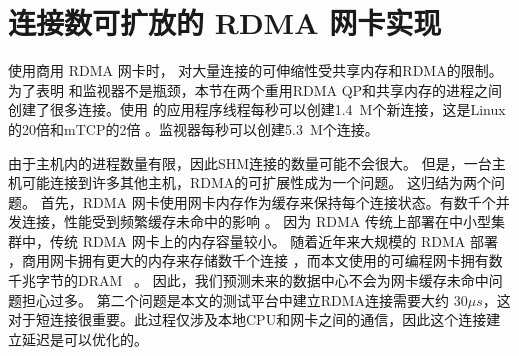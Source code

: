 \section{连接数可扩放的 RDMA 网卡实现}
\label{socksdirect:sec:discussion}




使用商用 RDMA 网卡时，\sys {} 对大量连接的可伸缩性受共享内存和RDMA的限制。
为了表明 \libipc {} 和监视器不是瓶颈，本节在两个重用RDMA QP和共享内存的进程之间创建了很多连接。使用 \libipc {} 的应用程序线程每秒可以创建1.4~M个新连接，这是Linux的20倍和mTCP的2倍 \cite {jeong2014mtcp}。监视器每秒可以创建5.3~M个连接。

由于主机内的进程数量有限，因此SHM连接的数量可能不会很大。
但是，一台主机可能连接到许多其他主机，RDMA的可扩展性成为一个问题。
这归结为两个问题。
首先，RDMA 网卡使用网卡内存作为缓存来保持每个连接状态。有数千个并发连接，性能受到频繁缓存未命中的影响 \cite {mprdma,kaminsky2016design,kalia2018datacenter}。
因为 RDMA 传统上部署在中小型集群中，传统 RDMA 网卡上的内存容量较小。
随着近年来大规模的 RDMA 部署 \cite {guo2016rdma}，商用网卡拥有更大的内存来存储数千个连接 \cite {kalia2018datacenter}，而本文使用的可编程网卡拥有数千兆字节的DRAM~ \cite {mellanox-innova,mellanox-bluefield,smartnic}。
因此，我们预测未来的数据中心不会为网卡缓存未命中问题担心过多。
第二个问题是本文的测试平台中建立RDMA连接需要大约 $30 \mu s$，这对于短连接很重要。此过程仅涉及本地CPU和网卡之间的通信，因此这个连接建立延迟是可以优化的。

